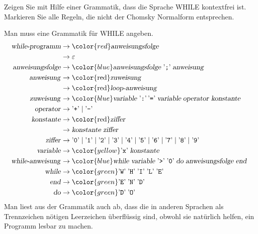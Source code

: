 Zeigen Sie mit Hilfe einer Grammatik, dass die Sprache WHILE kontextfrei ist.
Markieren Sie alle Regeln, die nicht der Chomsky Normalform entsprechen.


\begin{loesung}
Man muss eine Grammatik für WHILE angeben.
\begin{align*}
\text{\textsl{while-programm}}&\to{\color{red}\text{\textsl{anweisungsfolge}}}\\
&\to\varepsilon\\
\text{\textsl{anweisungsfolge}}
&\to{\color{blue}\text{\textsl{anweisungsfolge}}\;\text{'{\tt ;}'}\;
\text{\textsl{anweisung}}}
\\
\text{\textsl{anweisung}}
&\to\text{\color{red}\textsl{zuweisung}}
\\
&\to\text{\color{red}\textsl{loop-anweisung}}
\\
\text{\textsl{zuweisung}}
&\to
{\color{blue}
\text{\textsl{variable}}\; \text{'{\tt :}'}\, \text{'{\tt =}'}\;
\textsl{variable}\;\text{\textsl{operator}}\;\text{\textsl{konstante}}}
\\
\text{\textsl{operator}}
&\to\text{'{\tt +}'}\;|\;\text{'{\tt -}'}
\\
\text{\textsl{konstante}}&\to\text{\color{red}\textsl{ziffer}}\\
&\to\text{\textsl{konstante}}\;\text{\textsl{ziffer}}
\\
\text{\textsl{ziffer}}&\to 
\text{'{\tt 0}'}\;|\;
\text{'{\tt 1}'}\;|\;
\text{'{\tt 2}'}\;|\;
\text{'{\tt 3}'}\;|\;
\text{'{\tt 4}'}\;|\;
\text{'{\tt 5}'}\;|\;
\text{'{\tt 6}'}\;|\;
\text{'{\tt 7}'}\;|\;
\text{'{\tt 8}'}\;|\;
\text{'{\tt 9}'}\\
\text{\textsl{variable}}&\to{\color{yellow} \text{'{\tt x}'}\;\text{\textsl{konstante}}}\\
\text{\textsl{while-anweisung}}&\to{\color{blue}
\text{\textsl{while}}\;
\text{\textsl{variable}}\;
\text{'{\tt >}'}\;
\text{'{\tt 0}'}\;
\text{\textsl{do}}\;
\text{\textsl{anweisungsfolge}}\;
\text{\textsl{end}}}\\
\text{\textsl{while}}&\to
{\color{green}\text{'{\tt W}'}\; \text{'{\tt H}'}\; \text{'{\tt I}'}\; \text{'{\tt L}'}\; \text{'{\tt E}'}}\\
\text{\textsl{end}}&\to{\color{green} \text{'{\tt E}'}\; \text{'{\tt N}'}\; \text{'{\tt D}'}}\\
\text{\textsl{do}}&\to{\color{green} \text{'{\tt D}'}\; \text{'{\tt O}'}} \\
\end{align*}
Man liest aus der Grammatik auch ab, dass die in anderen Sprachen als
Trennzeichen nötigen Leerzeichen überflüssig sind, obwohl sie natürlich
helfen, ein Programm lesbar zu machen.


\end{loesung}
